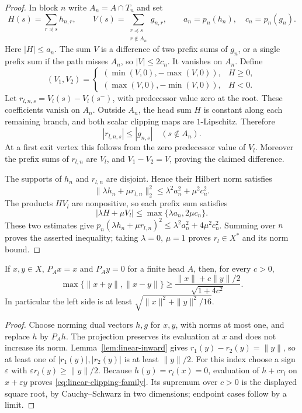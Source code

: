 \begin{proof}
In block $n$ write $A_n=A\cap T_n$ and set
\[
 H(s)=\sum_{r\preceq s}h_{n,r},\qquad
 V(s)=\sum_{\substack{r\preceq s\\r\notin A_n}}g_{n,r},
 \qquad a_n=p_n(h_n),\quad c_n=p_n(g_n).
\]
Here $|H|\le a_n$.  The sum $V$ is a difference of two prefix sums
of $g_n$, or a single prefix sum if the path misses $A_n$, so
$|V|\le2c_n$.  It vanishes on $A_n$.  Define
\[
 (V_1,V_2)=
 \begin{cases}
  (\min(V,0),-\max(V,0)),&H\ge0,\\
  (\max(V,0),-\min(V,0)),&H<0.
 \end{cases}
\]
Let $r_{l,n,s}=V_l(s)-V_l(s^-)$, with predecessor value zero at the
root.  These coefficients vanish on $A_n$.  Outside $A_n$, the head
sum $H$ is constant along each remaining branch, and both scalar
clipping maps are $1$-Lipschitz.  Therefore
\[
 |r_{l,n,s}|\le|g_{n,s}| \quad(s\notin A_n).
\]
At a first exit vertex this follows from the zero predecessor value
of $V_l$.  Moreover the prefix sums of $r_{l,n}$ are $V_l$, and
$V_1-V_2=V$, proving the claimed difference.

The supports of $h_n$ and $r_{l,n}$ are disjoint.  Hence their Hilbert
norm satisfies
\[
 \|\lambda h_n+\mu r_{l,n}\|_2^2
 \le\lambda^2a_n^2+\mu^2c_n^2.
\]
The products $HV_l$ are nonpositive, so each prefix sum satisfies
\[
 |\lambda H+\mu V_l|
 \le\max\{\lambda a_n,2\mu c_n\}.
\]
These two estimates give
$p_n(\lambda h_n+\mu r_{l,n})^2
 \le\lambda^2a_n^2+4\mu^2c_n^2$.
Summing over $n$ proves the asserted inequality; taking
$\lambda=0$, $\mu=1$ proves $r_l\in X^*$ and its norm bound.
\end{proof}

\begin{theorem}
\label{thm:linear-head-tail-clipping}
If $x,y\in X$, $P_Ax=x$ and $P_Ay=0$ for a finite head $A$, then,
for every $c>0$,
\begin{equation}
 \max\{\|x+y\|,\|x-y\|\}
 \ge\frac{\|x\|+c\|y\|/2}{\sqrt{1+4c^2}}.
 \label{eq:linear-clipping-family}
\end{equation}
In particular the left side is at least
$\sqrt{\|x\|^2+\|y\|^2/16}$.
\end{theorem}

\begin{proof}
Choose norming dual vectors $h,g$ for $x,y$, with norms at most one,
and replace $h$ by $P_Ah$.  The projection preserves its evaluation
at $x$ and does not increase its norm.  Lemma~\ref{lem:linear-inward}
gives $r_1(y)-r_2(y)=\|y\|$, so at least one of
$|r_1(y)|,|r_2(y)|$ is at least $\|y\|/2$.  For this index choose
a sign $\varepsilon$ with $\varepsilon r_l(y)\ge\|y\|/2$.
Because $h(y)=r_l(x)=0$, evaluation of $h+cr_l$ on
$x+\varepsilon y$ proves \eqref{eq:linear-clipping-family}.
Its supremum over $c>0$ is the displayed square root, by
Cauchy--Schwarz in two dimensions; endpoint cases follow by a limit.
\end{proof}

